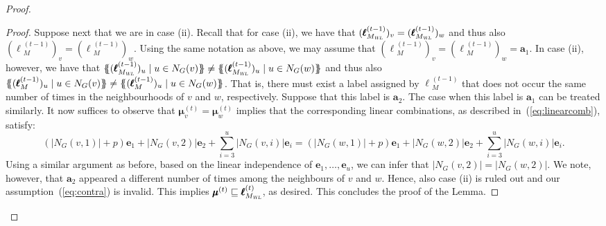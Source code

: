 \begin{proof}
{\begin{proof}
Suppose next that we are in case (ii). Recall that for case (ii), we have that
$(\pmb{\ell}{}_{M_{\textsl{WL}}}^{(t-1)})_v=(\pmb{\ell}{}_{M_{\textsl{WL}}}^{(t-1)})_w$ and thus also  $(\pmb{\ell}{}_M^{(t-1)})_v=(\pmb{\ell}{}_M^{(t-1)})_w$.
	Using the same notation as above, we may assume that $(\pmb{\ell}{}_M^{(t-1)})_v=(\pmb{\ell}{}_M^{(t-1)})_w=\mathbf{a}_1$. In case (ii), however, we have that
	$
	\ldbl (\pmb{\ell}{}_{M_{\textsl{WL}}}^{(t-1)})_{u} \st u \in N_G(v) \rdbl\neq
	\ldbl (\pmb{\ell}{}_{M_{\textsl{WL}}}^{(t-1)})_{u} \st u \in N_G(w) \rdbl
	$ and thus also 
	$
	\ldbl (\pmb{\ell}{}_{M}^{(t-1)})_{u} \st u \in N_G(v) \rdbl\neq
	\ldbl (\pmb{\ell}{}_{M}^{(t-1)})_{u} \st u \in N_G(w) \rdbl
	$.
	That is, there must exist a label assigned by $\pmb{\ell}{}_M^{(t-1)}$ that does not occur the same number of times in the neighbourhoods of $v$ and $w$, respectively. Suppose that this label is $\mathbf{a}_2$. The case when this label is $\mathbf{a}_1$ can be treated similarly. 
	It now suffices to  observe that $\pmb{\mu}^{(t)}_{v}=\pmb{\mu}^{(t)}_{w}$ implies that
the corresponding linear combinations, as described in~(\ref{eq:linearcomb}), satisfy:
$$
\left(|N_G(v,1)|+p\right)\mathbf{e}_1 +|N_G(v,2)|\mathbf{e}_2+\sum_{i=3}^u |N_G(v,i)|\mathbf{e}_i=
\left(|N_G(w,1)|+p\right)\mathbf{e}_1 +|N_G(w,2)|\mathbf{e}_2+\sum_{i=3}^u |N_G(w,i)|\mathbf{e}_i.
$$
Using a similar argument as before, based on the linear independence of $\mathbf{e}_1,\ldots,\mathbf{e}_u$,
we can infer that $|N_G(v,2)|=|N_G(w,2)|$. We note,
however, that $\mathbf{a}_2$ appeared a different number
of times among the neighbours of $v$ and $w$. Hence, also case (ii) is ruled out and our assumption~(\ref{eq:contra})
is invalid. This implies $\pmb{\mu}^{(t)}\sqsubseteq\pmb{\ell}_{M_{\textsl{WL}}}^{(t)}$, as desired. This concludes the proof of the Lemma. 
\end{proof}



}
\end{proof}
